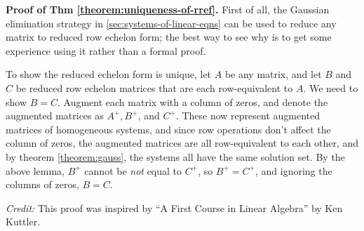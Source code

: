 \documentclass[11pt, letterpaper]{report}
\newenvironment{book}{}{}
\newcounter{example}[section]
\newcommand{\example}{\refstepcounter{example}%
\par\noindent\textbf{Example~\theexample.} }
\newcounter{theorem}[chapter]
\newcommand{\R}{\mathbb{R}}
\DeclareMathOperator{\nul}{null}
\DeclareMathOperator{\spn}{span}
\begin{document}
\begin{book}
\textbf{Proof of Thm \ref{theorem:uniqueness-of-rref}.} First of all, the Gaussian elimination strategy in \ref{sec:systems-of-linear-eqns} can be used to reduce any matrix to reduced row echelon form; the best way to see why is to get some experience using it rather than a formal proof. 

To show the reduced echelon form is unique, let $A$ be any matrix, and let $B$ and $C$ be reduced row echelon matrices that are each row-equivalent to $A$. We need to show $B = C$. Augment each matrix with a column of zeros, and denote the augmented matrices as $A^+, B^+$, and $C^+$. These now represent augmented matrices of homogeneous systems, and since row operations don't affect the column of zeros, the augmented matrices are all row-equivalent to each other, and by theorem \ref{theorem:gauss}, the systems all have the same solution set. By the above lemma, $B^+$ cannot be \emph{not} equal to $C^+$, so $B^+=C^+$, and ignoring the columns of zeros, $B=C$. \blacksquare

\emph{Credit:} This proof was inspired by ``A First Course in Linear Algebra'' by Ken Kuttler.
\end{book}



\end{document}

